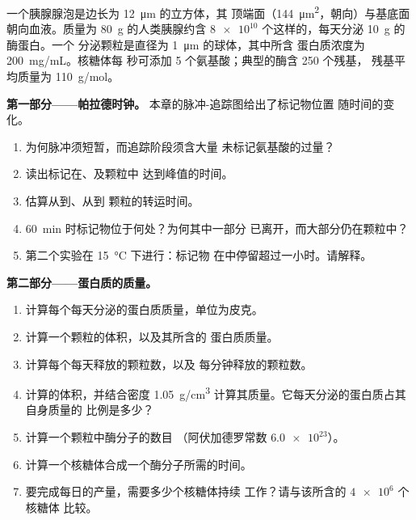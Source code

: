 \begin{problem}
\label{pb:b1:eukaryotic-cell:1}
一个胰腺腺泡是边长为 \qty{12}{\micro m} 的立方体，其
顶端面（\qty{144}{\micro m^2}，朝向）与基底面
朝向血液。质量为 \qty{80}{g} 的人类胰腺约含 $\num{8e10}$
个这样的，每天分泌 \qty{10}{g} 的酶蛋白。一个
分泌颗粒是直径为 \qty{1}{\micro m} 的球体，其中所含
蛋白质浓度为 \qty{200}{mg/mL}。核糖体每
秒可添加 \qty{5}{} 个氨基酸；典型的酶含 \qty{250}{} 个残基，
残基平均质量为 \qty{110}{g/mol}。

\medskip
\noindent\textbf{第一部分——帕拉德时钟。}
本章的脉冲-追踪图给出了标记物位置
随时间的变化。
\begin{enumerate}
  \item 为何脉冲须短暂，而追踪阶段须含大量
        未标记氨基酸的过量？
  \item 读出标记在、及颗粒中
        达到峰值的时间。
  \item 估算从到、从到
        颗粒的转运时间。
  \item \qty{60}{min} 时标记物位于何处？为何其中一部分
        已离开，而大部分仍在颗粒中？
  \item 第二个实验在 \qty{15}{\celsius} 下进行：标记物
        在中停留超过一小时。请解释。
\end{enumerate}

\medskip
\noindent\textbf{第二部分——蛋白质的质量。}
\begin{enumerate}[resume]
  \item 计算每个每天分泌的蛋白质质量，单位为皮克。
  \item 计算一个颗粒的体积，以及其所含的
        蛋白质质量。
  \item 计算每个每天释放的颗粒数，以及
        每分钟释放的颗粒数。
  \item 计算的体积，并结合密度
        \qty{1.05}{g/cm^3} 计算其质量。它每天分泌的蛋白质占其自身质量的
        比例是多少？
  \item 计算一个颗粒中酶分子的数目
        （阿伏加德罗常数 $\num{6.0e23}$）。
  \item 计算一个核糖体合成一个酶分子所需的时间。
  \item 要完成每日的产量，需要多少个核糖体持续
        工作？请与该所含的 $\num{4e6}$ 个核糖体
        比较。
\end{enumerate}


\end{problem}
